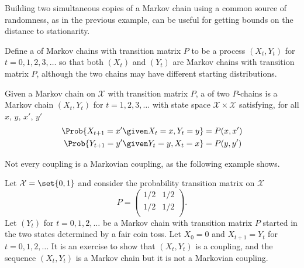 \documentclass[12pt]{article}
\begin{document}
Building two simultaneous copies of a Markov chain using a common source
of randomness, as in the previous example, can be useful for getting
bounds on the distance to stationarity.

\begin{definition}
    Define a  of Markov chains with transition matrix \(
    P \) to be a process \( (X_t, Y_t) \) for \( t = 0, 1,2,3, \dots \)
    so that both \( (X_t) \) and \( (Y_t) \) are Markov chains with
    transition matrix \( P \), although the two chains may have different
    starting distributions.
\end{definition}

\begin{definition}
    Given a Markov chain on \( \mathcal{X} \) with transition matrix
    \( P \), a  of two \( P \)-chains is a Markov chain
    \( (X_t, Y_t) \) for \( t=1, 2, 3, \dots \) with state space \( \mathcal{X}
    \times \mathcal{X}\) satisfying, for all \(x\), \(y\), \(x'\), \(y'\)
    \begin{align*}
        \Prob{X_{t+1} = x' \given X_t = x, Y_t = y} &= P(x,x') \\
        \Prob{Y_{t+1} = y' \given Y_t = y, X_t = x} &= P(y,y') \\
    \end{align*}
\end{definition}

Not every coupling is a Markovian coupling, as the following example
shows.
\begin{example}
    Let \( \mathcal{X} = \set{0,1}\) and consider the probability
    transition matrix on \( \mathcal{X} \)
    \[
        P =
        \begin{pmatrix}
            1/2 & 1/2 \\
            1/2 & 1/2 \\
        \end{pmatrix}
        .
    \] Let \( (Y_t) \) for \( t = 0,1,2, \dots \) be a Markov chain with
    transition matrix \( P \) started in the two states determined by a
    fair coin toss.  Let \( X_0 = 0 \) and \( X_{t+1} = Y_t \) for \(
    t=0, 1, 2, \dots \) It is an exercise to show that \( (X_t, Y_t) \)
    is a coupling, and the sequence \( (X_t, Y_t) \) is a Markov chain
    but it is not a Markovian coupling.
\end{example}
\end{document}
